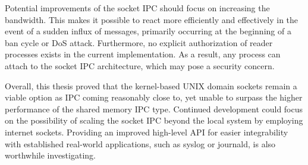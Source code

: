 Potential improvements of the socket \ac{IPC} should focus on increasing the bandwidth.
This makes it possible to react more efficiently and effectively in the event of a sudden influx of messages, primarily occurring at the beginning of a ban cycle or \ac{DoS} attack.
Furthermore, no explicit authorization of reader processes exists in the current implementation.
As a result, any process can attach to the socket \ac{IPC} architecture, which may pose a security concern.

Overall, this thesis proved that the kernel-based UNIX domain sockets remain a viable option as \ac{IPC} coming reasonably close to, yet unable to surpass the higher performance of the shared memory \ac{IPC} type.
Continued development could focus on the possibility of scaling the socket \ac{IPC} beyond the local system by employing internet sockets.
Providing an improved high-level \ac{API} for easier integrability with established real-world applications, such as syslog or journald, is also worthwhile investigating.
